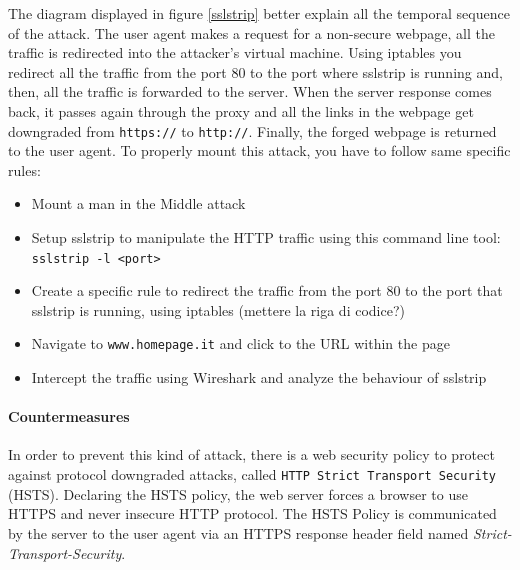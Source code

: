 \documentclass[draft]{article}
\begin{document}
The diagram displayed in figure \ref{sslstrip} better explain all the temporal sequence of the attack.
The user agent makes a request for a non-secure webpage, all the traffic is redirected into the attacker's virtual machine.
Using iptables you redirect all the traffic from the port 80 to the port where sslstrip is running and, then,
all the traffic is forwarded to the server. When the server response comes back,
it passes again through the proxy and all the links in the webpage get downgraded from \texttt{https://} to \texttt{http://}.
Finally, the forged webpage is returned to the user agent.
To properly mount this attack, you have to follow same specific rules:
\begin{itemize}
  \item Mount a man in the Middle attack
  \item Setup sslstrip to manipulate the HTTP traffic using this command line tool: \texttt{sslstrip -l <port>}
  \item Create a specific rule to redirect the traffic from the port 80 to the port that sslstrip is running, using iptables (mettere la riga di codice?)
  \item Navigate to \texttt{www.homepage.it} and click to the URL within the page
  \item Intercept the traffic using Wireshark and analyze the behaviour of sslstrip
\end{itemize}
\paragraph{Countermeasures}
In order to prevent this kind of attack, there is a web security policy to protect against protocol downgraded attacks, called \texttt{HTTP Strict Transport Security} (HSTS). Declaring the HSTS policy, the web server forces a browser to use HTTPS and never insecure HTTP protocol. The HSTS Policy is communicated by the server to the user agent via an HTTPS response header field named \textit{Strict-Transport-Security}.
\newpage
\end{document}
